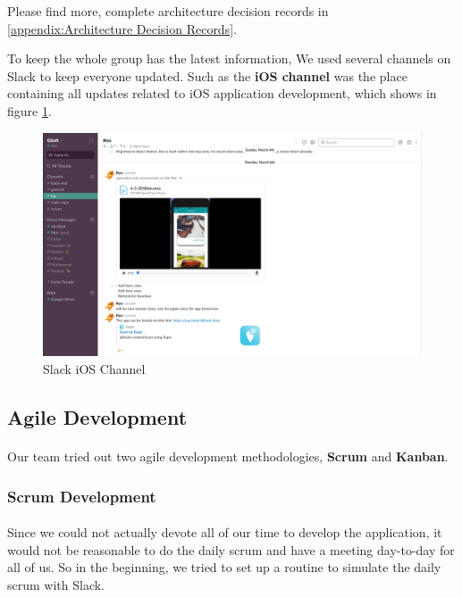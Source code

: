 \documentclass[12pt,a4paper]{article}
\begin{document}
        Please find more, complete architecture decision records in \ref{appendix:Architecture Decision Records}.
        
        To keep the whole group has the latest information, We used several channels on Slack to keep everyone updated. Such as the {\bf iOS channel} was the place containing all updates related to iOS application development, which shows in figure \ref{fig:Slack iOS Channel}. 
        
        \begin{figure}[H]
          \centering
          \includegraphics[width=1\textwidth]{../assets/development-records-slack-ios-channel.png}
          \caption{Slack iOS Channel}
          \label{fig:Slack iOS Channel}
        \end{figure}

      \subsection{Agile Development} 
        
        \paragraph{}Our team tried out two agile development methodologies, {\bf Scrum} and {\bf Kanban}.

        \subsubsection{Scrum Development}
          \paragraph{}Since we could not actually devote all of our time to develop the application, it would not be reasonable to do the daily scrum and have a meeting day-to-day for all of us. So in the beginning, we tried to set up a routine to simulate the daily scrum with Slack.
\end{document}
